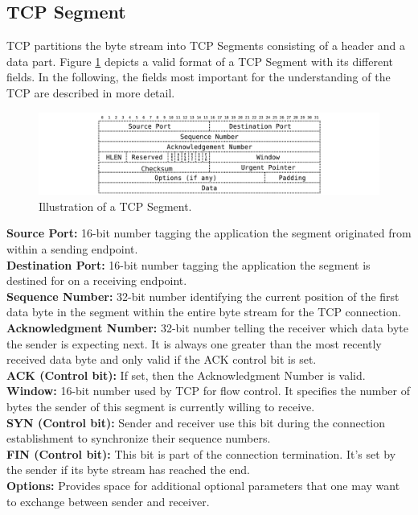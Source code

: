 \subsection*{TCP Segment}

TCP partitions the byte stream into TCP Segments consisting of a header and a data part. Figure \ref{fig:TCPSegment} depicts a valid format of a TCP Segment with its different fields. In the following, the fields most important for the understanding of the TCP are described in more detail. 

\begin{figure} [H]
	\begin{center}
		\def\svgwidth{1\textwidth}
		\includegraphics[scale=0.2]{../illustrations/importantConcepts/TCPSegment.pdf}  
		\caption[Caption for the list of figures.]{Illustration of a TCP Segment.}
		\label{fig:TCPSegment}
	\end{center}
\end{figure}

{\small \textbf{Source Port:} 16-bit number tagging the application the segment originated from within a sending endpoint. \smallskip\\
\textbf{Destination Port:} 16-bit number tagging the application the segment is destined for on a receiving endpoint. \smallskip\\
\textbf{Sequence Number:} 32-bit number identifying the current position of the first data byte in the segment within the entire byte stream for the TCP connection. \smallskip\\
\textbf{Acknowledgment Number:} 32-bit number telling the receiver which data byte the sender is expecting next. It is always one greater than the most recently received data byte and only valid if the ACK control bit is set. \smallskip\\
\textbf{ACK (Control bit):} If set, then the Acknowledgment Number is valid. \smallskip\\
\textbf{Window:} 16-bit number used by TCP for flow control. It specifies the number of bytes the sender of this segment is currently willing to receive. \smallskip\\
\textbf{SYN (Control bit):} Sender and receiver use this bit during the connection establishment to synchronize their sequence numbers.  \smallskip\\
\textbf{FIN (Control bit):} This bit is part of the connection termination. It's set by the sender if its byte stream has reached the end. \smallskip\\
\textbf{Options:} Provides space for additional optional parameters that one may want to exchange between sender and receiver. 
}
 
